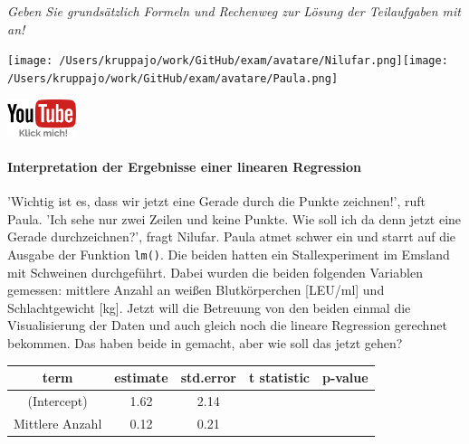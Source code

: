 \documentclass[a4paper, 9pt]{scrartcl}\usepackage[]{graphicx}\usepackage[]{xcolor}
\begin{document}
\textit{Geben Sie grundsätzlich Formeln und Rechenweg zur Lösung der Teilaufgaben mit an!} \\[1Ex]
 

 
\begin{minipage}[t]{0.5\textwidth}
\texttt{[image: /Users/kruppajo/work/GitHub/exam/avatare/Nilufar.png]}\hspace{-4mm}\texttt{[image: /Users/kruppajo/work/GitHub/exam/avatare/Paula.png]}
\end{minipage}
\begin{minipage}[t]{0.5\textwidth}
\hfill
\href{https://youtu.be/lJp8rFmMnrs}{\includegraphics[width = 2cm]{img/youtube}}
\end{minipage}



\paragraph{Interpretation der Ergebnisse einer linearen Regression}


'Wichtig ist es, dass wir jetzt eine Gerade durch die Punkte zeichnen!', ruft Paula. 'Ich sehe nur zwei Zeilen und keine Punkte. Wie soll ich da denn jetzt eine Gerade durchzeichnen?', fragt Nilufar. Paula atmet schwer ein und starrt auf die \Rlogo Ausgabe der Funktion \texttt{lm()}. Die beiden hatten ein Stallexperiment im Emsland mit Schweinen durchgeführt. Dabei wurden die beiden folgenden Variablen gemessen: mittlere Anzahl an weißen Blutkörperchen [LEU/ml] und Schlachtgewicht [kg]. Jetzt will die Betreuung von den beiden einmal die Visualisierung der Daten und auch gleich noch die lineare Regression gerechnet bekommen. Das haben beide in \Rlogo gemacht, aber wie soll das jetzt gehen?

\begin{table}[!h]
\centering\begingroup\fontsize{12}{14}\selectfont

\begin{tabular}{ccccc}
\toprule
term & estimate & std.error & t statistic & p-value\\
\midrule
(Intercept) & 1.62 & 2.14 &  & \\
Mittlere Anzahl & 0.12 & 0.21 &  & \\
\bottomrule
\end{tabular}
\endgroup{}
\end{table}
\end{document}
